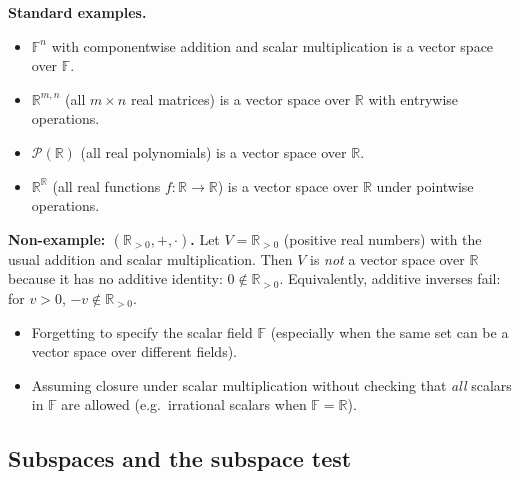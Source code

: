 \begin{examplebox}
\textbf{Standard examples.}
\begin{itemize}
\item $\mathbb{F}^n$ with componentwise addition and scalar multiplication is a vector space over $\mathbb{F}$.
\item $\mathbb{R}^{m,n}$ (all $m\times n$ real matrices) is a vector space over $\mathbb{R}$ with entrywise operations.
\item $\mathcal{P}(\mathbb{R})$ (all real polynomials) is a vector space over $\mathbb{R}$.
\item $\mathbb{R}^{\mathbb{R}}$ (all real functions $f:\mathbb{R}\to\mathbb{R}$) is a vector space over $\mathbb{R}$ under pointwise operations.
\end{itemize}
\end{examplebox}

\begin{examplebox}
\textbf{Non-example: $(\mathbb{R}_{>0},+,\cdot)$.}
Let $V=\mathbb{R}_{>0}$ (positive real numbers) with the usual addition and scalar multiplication.
Then $V$ is \emph{not} a vector space over $\mathbb{R}$ because it has no additive identity: $0\notin \mathbb{R}_{>0}$.
Equivalently, additive inverses fail: for $v>0$, $-v\notin \mathbb{R}_{>0}$.
\end{examplebox}

\begin{commonmistake}
\begin{itemize}
\item Forgetting to specify the scalar field $\mathbb{F}$ (especially when the same set can be a vector space over different fields).
\item Assuming closure under scalar multiplication without checking that \emph{all} scalars in $\mathbb{F}$ are allowed (e.g.\ irrational scalars when $\mathbb{F}=\mathbb{R}$).
\end{itemize}
\end{commonmistake}




\subsection{Subspaces and the subspace test}


